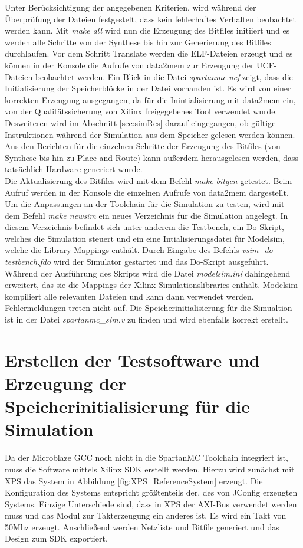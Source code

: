 Unter Berücksichtigung der angegebenen Kriterien, wird während der Überprüfung der Dateien festgestelt, dass kein fehlerhaftes Verhalten beobachtet werden kann. Mit \textit{make all} wird nun die Erzeugung des Bitfiles initiiert und es werden alle Schritte von der Synthese bis hin zur Generierung des Bitfiles durchlaufen. Vor dem Schritt Translate werden die ELF-Dateien erzeugt und es können in der Konsole die Aufrufe von data2mem zur Erzeugung der UCF-Dateien beobachtet werden. Ein Blick in die Datei \textit{spartanmc.ucf} zeigt, dass die Initialisierung der Speicherblöcke in der Datei vorhanden ist. Es wird von einer korrekten Erzeugung ausgegangen, da für die Inintialisierung mit data2mem ein, von der Qualitätssicherung von Xilinx freigegebenes Tool verwendet wurde. Desweiteren wird im Abschnitt \ref{sec:simRes} darauf eingegangen, ob gültige Instruktionen während der Simulation aus dem Speicher gelesen werden können. Aus den Berichten für die einzelnen Schritte der Erzeugung des Bitfiles (von Synthese bis hin zu Place-and-Route) kann außerdem herausgelesen werden, dass tatsächlich Hardware generiert wurde.\\
Die Aktualisierung des Bitfiles wird mit dem Befehl \textit{make bitgen} getestet. Beim Aufruf werden in der Konsole die einzelnen Aufrufe von data2mem dargestellt.\\
Um die Anpassungen an der Toolchain für die Simulation zu testen, wird mit dem Befehl \textit{make newsim} ein neues Verzeichnis für die Simulation angelegt. In diesem Verzeichnis befindet sich unter anderem die Testbench, ein Do-Skript, welches die Simulation steuert und ein eine Intialisierungsdatei für Modelsim, welche die Library-Mappings enthält. Durch Eingabe des Befehls \textit{vsim -do testbench.fdo} wird der Simulator gestartet und das Do-Skript ausgeführt. Während der Ausführung des Skripts wird die Datei \textit{modelsim.ini} dahingehend erweitert, das sie die Mappings der Xilinx Simulationslibraries enthält. Modelsim kompiliert alle relevanten Dateien und kann dann verwendet werden. Fehlermeldungen treten nicht auf. Die Speicherinitialisierung für die Simualtion ist in der Datei \textit{spartanmc\_sim.v} zu finden und wird ebenfalls korrekt erstellt.
\section{Erstellen der Testsoftware und Erzeugung der Speicherinitialisierung für die Simulation}
Da der Microblaze GCC noch nicht in die SpartanMC Toolchain integriert ist, muss die Software mittels Xilinx SDK erstellt werden. Hierzu wird zunächst mit XPS das System in Abbildung \ref{fig:XPS_ReferenceSystem} erzeugt. Die Konfiguration des Systems entspricht größtenteils der, des von JConfig erzeugten Systems. Einzige Unterschiede sind, dass in XPS der AXI-Bus verwendet werden muss und das Modul zur Takterzeugung ein anderes ist. Es wird ein Takt von 50Mhz erzeugt. Anschließend werden Netzliste und Bitfile generiert und das Design zum SDK exportiert.

